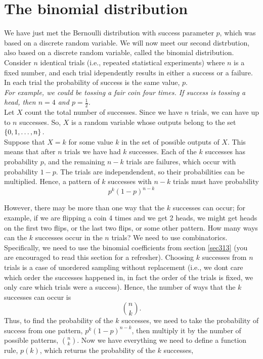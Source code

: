 \section{The binomial distribution} \label{1 the binomial distribution} \label{binomial distribution}
We have just met the Bernoulli distribution with success parameter $p$, which was based on a discrete random variable. We will now meet our second distrbution, also based on a discrete random variable, called the binomial distribution. \\

\noindent Consider $n$ identical trials (i.e., repeated statistical experiments) where $n$ is a fixed number, and each trial idependently results in either a success or a failure. In each trial the probability of success is the same value, $p$. \\

\noindent \textit{For example, we could be tossing a fair coin four times. If success is tossing a head, then $n = 4$ and $p = \frac{1}{2}$.} \\

\noindent Let $X$ count the total number of successes. Since we have $n$ trials, we can have up to $n$ successes. So, $X$ is a random variable whose outputs belong to the set $\left\{0,1,\ldots,n\right\}.$ \\

\noindent  Suppose that $X = k$ for some value $k$ in the set of possible outputs of $X$. This means that after $n$ trials we have had $k$ successes. Each of the $k$ successes has probability $p$, and the remaining $n-k$ trials are failures, which occur with probability $1-p$. The trials are independendent, so their probabilities can be multiplied. Hence, a pattern of $k$ successes with $n - k$ trials must have probability
\[
p^k(1-p)^{n-k}
\]

\noindent However, there may be more than one way that the $k$ successes can occur; for example, if we are flipping a coin 4 times and we get 2 heads, we might get heads on the first two flips, or the last two flips, or some other pattern. How many ways can the $k$ successes occur in the $n$ trials? We need to use combinatorics. Specifically, we need to use the binomial coefficients from section \ref{sec313} (you are encouraged to read this section for a refresher). Choosing $k$ successes from $n$ trials is a case of unordered sampling without replacement (i.e., we dont care which order the successes happened in, in fact the order of the trials is fixed, we only care which trials were a success). Hence, the number of ways that the $k$ successes can occur is
\[
\binom{n}{k}.
\]
Thus, to find the probability of the $k$ successes, we need to take the probability of success from one pattern, $p^k(1-p)^{n-k}$, then multiply it by the number of possible patterns, $\binom{n}{k}$. Now we have everything we need to define a function rule, $p(k)$, which returns the probability of the $k$ successes, \label{binom pmf}

